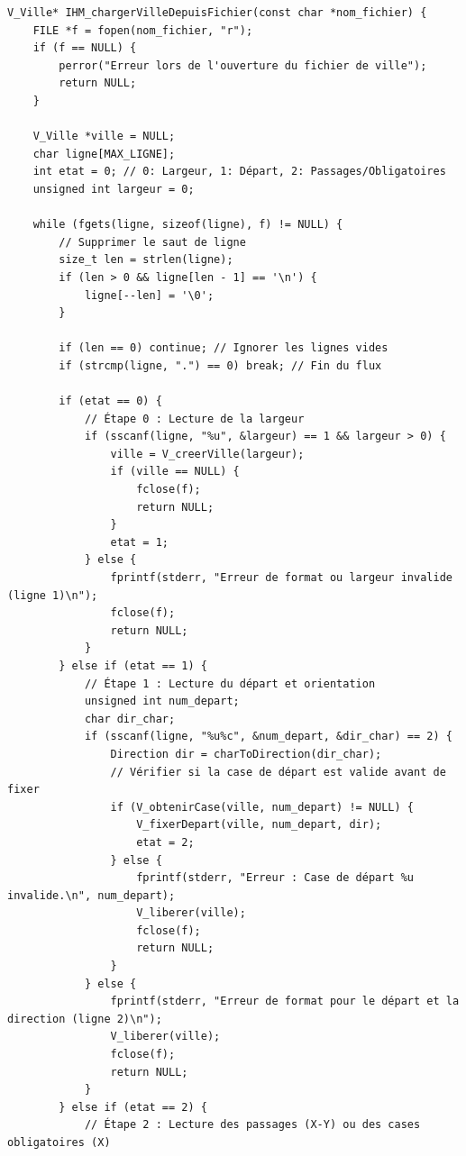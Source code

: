 \begin{lstlisting}[caption={IHM\_chargerVilleDepuisFichier}]
V_Ville* IHM_chargerVilleDepuisFichier(const char *nom_fichier) {
    FILE *f = fopen(nom_fichier, "r");
    if (f == NULL) {
        perror("Erreur lors de l'ouverture du fichier de ville");
        return NULL;
    }

    V_Ville *ville = NULL;
    char ligne[MAX_LIGNE];
    int etat = 0; // 0: Largeur, 1: Départ, 2: Passages/Obligatoires
    unsigned int largeur = 0;

    while (fgets(ligne, sizeof(ligne), f) != NULL) {
        // Supprimer le saut de ligne
        size_t len = strlen(ligne);
        if (len > 0 && ligne[len - 1] == '\n') {
            ligne[--len] = '\0';
        }
        
        if (len == 0) continue; // Ignorer les lignes vides
        if (strcmp(ligne, ".") == 0) break; // Fin du flux

        if (etat == 0) {
            // Étape 0 : Lecture de la largeur
            if (sscanf(ligne, "%u", &largeur) == 1 && largeur > 0) {
                ville = V_creerVille(largeur);
                if (ville == NULL) {
                    fclose(f);
                    return NULL;
                }
                etat = 1;
            } else {
                fprintf(stderr, "Erreur de format ou largeur invalide (ligne 1)\n");
                fclose(f);
                return NULL;
            }
        } else if (etat == 1) {
            // Étape 1 : Lecture du départ et orientation
            unsigned int num_depart;
            char dir_char;
            if (sscanf(ligne, "%u%c", &num_depart, &dir_char) == 2) {
                Direction dir = charToDirection(dir_char);
                // Vérifier si la case de départ est valide avant de fixer
                if (V_obtenirCase(ville, num_depart) != NULL) {
                    V_fixerDepart(ville, num_depart, dir);
                    etat = 2;
                } else {
                    fprintf(stderr, "Erreur : Case de départ %u invalide.\n", num_depart);
                    V_liberer(ville);
                    fclose(f);
                    return NULL;
                }
            } else {
                fprintf(stderr, "Erreur de format pour le départ et la direction (ligne 2)\n");
                V_liberer(ville);
                fclose(f);
                return NULL;
            }
        } else if (etat == 2) {
            // Étape 2 : Lecture des passages (X-Y) ou des cases obligatoires (X)
            

\end{lstlisting}
